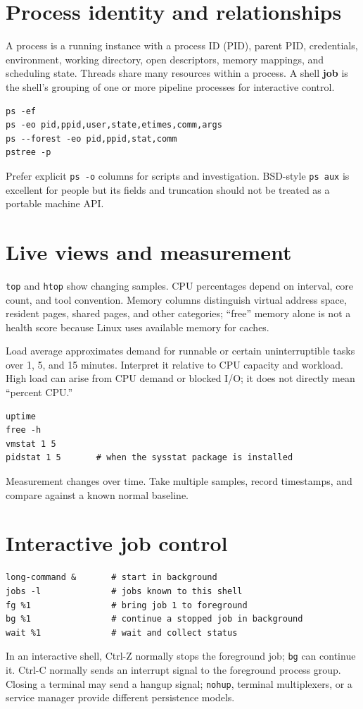 \documentclass[11pt,oneside,openany]{book}
\newcommand{\term}[1]{\textbf{\color{Navy}#1}}
\begin{document}
\section{Process identity and relationships}
A process is a running instance with a process ID (PID), parent PID, credentials, environment, working directory, open descriptors, memory mappings, and scheduling state. Threads share many resources within a process. A shell \term{job} is the shell's grouping of one or more pipeline processes for interactive control.

\begin{lstlisting}
ps -ef
ps -eo pid,ppid,user,state,etimes,comm,args
ps --forest -eo pid,ppid,stat,comm
pstree -p
\end{lstlisting}
Prefer explicit \texttt{ps -o} columns for scripts and investigation. BSD-style \texttt{ps aux} is excellent for people but its fields and truncation should not be treated as a portable machine API.

\section{Live views and measurement}
\texttt{top} and \texttt{htop} show changing samples. CPU percentages depend on interval, core count, and tool convention. Memory columns distinguish virtual address space, resident pages, shared pages, and other categories; “free” memory alone is not a health score because Linux uses available memory for caches.

Load average approximates demand for runnable or certain uninterruptible tasks over 1, 5, and 15 minutes. Interpret it relative to CPU capacity and workload. High load can arise from CPU demand or blocked I/O; it does not directly mean “percent CPU.”

\begin{lstlisting}
uptime
free -h
vmstat 1 5
pidstat 1 5       # when the sysstat package is installed
\end{lstlisting}
Measurement changes over time. Take multiple samples, record timestamps, and compare against a known normal baseline.

\section{Interactive job control}
\begin{lstlisting}
long-command &       # start in background
jobs -l              # jobs known to this shell
fg %1                # bring job 1 to foreground
bg %1                # continue a stopped job in background
wait %1              # wait and collect status
\end{lstlisting}
In an interactive shell, Ctrl-Z normally stops the foreground job; \texttt{bg} can continue it. Ctrl-C normally sends an interrupt signal to the foreground process group. Closing a terminal may send a hangup signal; \texttt{nohup}, terminal multiplexers, or a service manager provide different persistence models.
\end{document}
